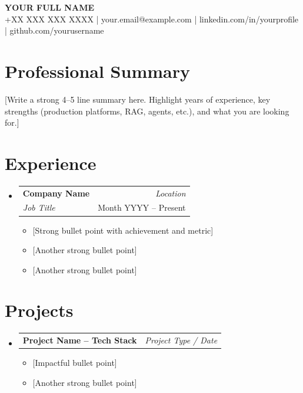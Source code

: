 \documentclass[10pt, letterpaper]{extarticle}
\makeatletter
\newcommand{\resumeItem}[1]{\item{#1}}
\newcommand{\resumeSubheading}[4]{
  \item
    \begin{tabular*}{1.0\textwidth}[t]{l@{\extracolsep{\fill}}r}
      \textbf{#1} & \textit{#4} \\
      \textit{#3} & #2 \\
    \end{tabular*}\vspace{1.5pt}
}
\newcommand{\resumeProjectHeading}[2]{
    \item
    \begin{tabular*}{\textwidth}[t]{@{}p{0.82\textwidth}@{\extracolsep{\fill}}r@{}}
       \textbf{#1} & \textit{#2} \\
    \end{tabular*}\vspace{2pt}
}
\makeatother
\begin{document}
\begin{center}
    \textbf{\Large YOUR FULL NAME} \\
    \vspace{3pt}
    \small{+XX XXX XXX XXXX \quad | \quad your.email@example.com \quad | \quad linkedin.com/in/yourprofile \quad | \quad github.com/yourusername}
\end{center}

\section{Professional Summary}
[Write a strong 4–5 line summary here. Highlight years of experience, key strengths (production platforms, RAG, agents, etc.), and what you are looking for.]

\section{Experience}

\begin{itemize}[label={}, leftmargin=0in]

    \resumeSubheading{Company Name}{Month YYYY – Present}{Job Title}{Location}
    \begin{itemize}[label={--}]
      \resumeItem{[Strong bullet point with achievement and metric]}
      \resumeItem{[Another strong bullet point]}
      \resumeItem{[Another strong bullet point]}
    \end{itemize}


\end{itemize}

\section{Projects}

\begin{itemize}[label={}, leftmargin=0in]

 \resumeProjectHeading{Project Name -- Tech Stack}{Project Type / Date}
 \begin{itemize}[label={--}]
    \resumeItem{[Impactful bullet point]}
    \resumeItem{[Another strong bullet point]}
 \end{itemize}


\end{itemize}
\end{document}
